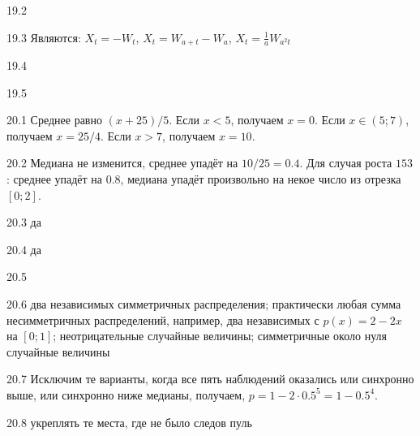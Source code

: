\protect \hypertarget {soln:19.2}{}
\begin{solution}{{19.2}}
\end{solution}
\protect \hypertarget {soln:19.3}{}
\begin{solution}{{19.3}}
Являются: $X_{t}=-W_{t}$, $X_{t}=W_{a+t}-W_{a}$, $X_{t}=\frac{1}{a}W_{a^{2}t}$
\end{solution}
\protect \hypertarget {soln:19.4}{}
\begin{solution}{{19.4}}
\end{solution}
\protect \hypertarget {soln:19.5}{}
\begin{solution}{{19.5}}
\end{solution}
\protect \hypertarget {soln:20.1}{}
\begin{solution}{{20.1}}
Среднее равно $(x+25)/5$. Если $x<5$, получаем $x=0$. Если $x \in (5; 7)$, получаем $x=25/4$. Если $x>7$, получаем $x=10$.
\end{solution}
\protect \hypertarget {soln:20.2}{}
\begin{solution}{{20.2}}
Медиана не изменится, среднее упадёт на $10/25=0.4$. Для случая роста $153$: среднее упадёт на $0.8$, медиана упадёт произвольно на некое число из отрезка $[0;2]$.
\end{solution}
\protect \hypertarget {soln:20.3}{}
\begin{solution}{{20.3}}
  да
\end{solution}
\protect \hypertarget {soln:20.4}{}
\begin{solution}{{20.4}}
да
\end{solution}
\protect \hypertarget {soln:20.5}{}
\begin{solution}{{20.5}}
\end{solution}
\protect \hypertarget {soln:20.6}{}
\begin{solution}{{20.6}}
  два независимых симметричных распределения; практически любая сумма несимметричных распределений, например, два независимых с $p(x)=2-2x$ на $[0;1]$; неотрицательные случайные величины; симметричные около нуля случайные величины
\end{solution}
\protect \hypertarget {soln:20.7}{}
\begin{solution}{{20.7}}
  Исключим те варианты, когда все пять наблюдений оказались или синхронно выше, или синхронно ниже медианы, получаем, $p=1-2\cdot 0.5^5=1-0.5^4$.
\end{solution}
\protect \hypertarget {soln:20.8}{}
\begin{solution}{{20.8}}
  укреплять те места, где не было следов пуль
\end{solution}

